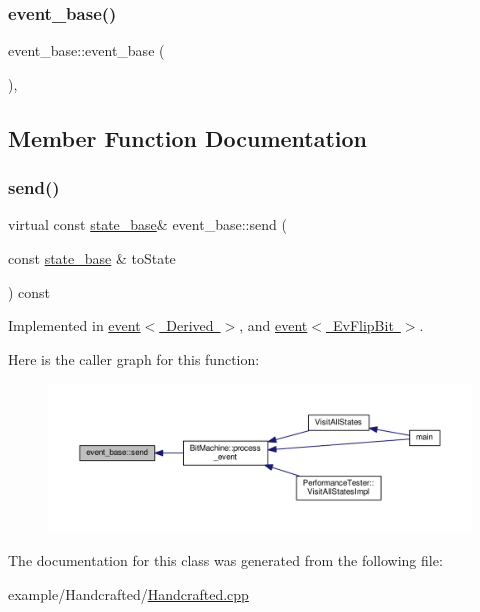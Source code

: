\subsubsection{\texorpdfstring{event\+\_\+base()}{event\_base()}}
{\footnotesize\ttfamily event\+\_\+base\+::event\+\_\+base (\begin{DoxyParamCaption}{ }\end{DoxyParamCaption})\hspace{0.3cm}{\ttfamily [inline]}, {\ttfamily [protected]}}



\subsection{Member Function Documentation}
\mbox{\label{classevent__base_aa145c3849ff0fa69e656cb88a5de80a7}} 
\subsubsection{\texorpdfstring{send()}{send()}}
{\footnotesize\ttfamily virtual const \mbox{\hyperlink{classstate__base}{state\+\_\+base}}\& event\+\_\+base\+::send (\begin{DoxyParamCaption}\item[{const \mbox{\hyperlink{classstate__base}{state\+\_\+base}} \&}]{to\+State }\end{DoxyParamCaption}) const\hspace{0.3cm}{\ttfamily [pure virtual]}}



Implemented in \mbox{\hyperlink{classevent_a6a5e444760d40536984c676f8fee77f3}{event$<$ Derived $>$}}, and \mbox{\hyperlink{classevent_a6a5e444760d40536984c676f8fee77f3}{event$<$ Ev\+Flip\+Bit $>$}}.

Here is the caller graph for this function\+:
\nopagebreak
\begin{figure}[H]
\begin{center}
\leavevmode
\includegraphics[width=350pt]{classevent__base_aa145c3849ff0fa69e656cb88a5de80a7_icgraph}
\end{center}
\end{figure}


The documentation for this class was generated from the following file\+:\begin{DoxyCompactItemize}
\item 
example/\+Handcrafted/\mbox{\hyperlink{_handcrafted_8cpp}{Handcrafted.\+cpp}}\end{DoxyCompactItemize}
